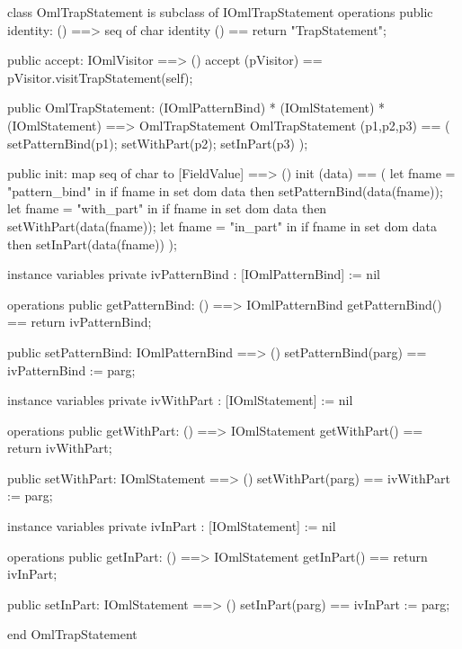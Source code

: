\begin{vdm_al}
class OmlTrapStatement is subclass of IOmlTrapStatement
operations
  public identity: () ==> seq of char
  identity () == return "TrapStatement";

  public accept: IOmlVisitor ==> ()
  accept (pVisitor) == pVisitor.visitTrapStatement(self);

  public OmlTrapStatement:
      (IOmlPatternBind) *
      (IOmlStatement) *
      (IOmlStatement) ==> OmlTrapStatement
  OmlTrapStatement (p1,p2,p3) == 
   ( setPatternBind(p1);
     setWithPart(p2);
     setInPart(p3) );

  public init: map seq of char to [FieldValue] ==> ()
  init (data) ==
    ( let fname = "pattern_bind" in
        if fname in set dom data
        then setPatternBind(data(fname));
      let fname = "with_part" in
        if fname in set dom data
        then setWithPart(data(fname));
      let fname = "in_part" in
        if fname in set dom data
        then setInPart(data(fname)) );

instance variables
  private ivPatternBind : [IOmlPatternBind] := nil

operations
  public getPatternBind: () ==> IOmlPatternBind
  getPatternBind() == return ivPatternBind;

  public setPatternBind: IOmlPatternBind ==> ()
  setPatternBind(parg) == ivPatternBind := parg;

instance variables
  private ivWithPart : [IOmlStatement] := nil

operations
  public getWithPart: () ==> IOmlStatement
  getWithPart() == return ivWithPart;

  public setWithPart: IOmlStatement ==> ()
  setWithPart(parg) == ivWithPart := parg;

instance variables
  private ivInPart : [IOmlStatement] := nil

operations
  public getInPart: () ==> IOmlStatement
  getInPart() == return ivInPart;

  public setInPart: IOmlStatement ==> ()
  setInPart(parg) == ivInPart := parg;

end OmlTrapStatement
\end{vdm_al}

